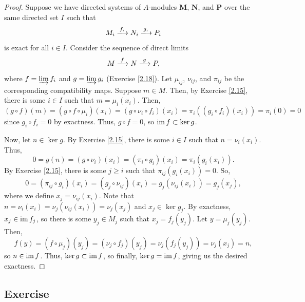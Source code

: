 \begin{proof}
Suppose we have directed systems of $A$-modules $\mathbf{M}$, $\mathbf{N}$, and $\mathbf{P}$ over the same directed set $I$ such that
$$M_i \xlongrightarrow{f_i} N_i \xlongrightarrow{g_i} P_i$$
is exact for all $i \in I$. Consider the sequence of direct limits
$$M \xlongrightarrow{f} N \xlongrightarrow{g} P,$$
where $f = \varinjlim f_i$ and $g = \varinjlim g_i$ (Exercise \ref{2.18}). Let $\mu_{ij}$, $\nu_{ij}$, and $\pi_{ij}$ be the corresponding
compatibility maps. Suppose $m \in M$. Then, by Exercise \ref{2.15}, there is some $i \in I$ such that $m = \mu_i(x_i)$. Then,
$$(g \circ f)(m) = (g \circ f \circ \mu_i)(x_i) = (g \circ \nu_i \circ f_i)(x_i) = \pi_i((g_i \circ f_i)(x_i)) = \pi_i(0) = 0$$
since $g_i \circ f_i = 0$ by exactness. Thus, $g \circ f = 0$, so $\operatorname{im} f \subset \ker g$.

Now, let $n \in \ker g$. By Exercise \ref{2.15}, there is some $i \in I$ such that $n = \nu_i(x_i)$. Thus,
$$0 = g(n) = (g \circ \nu_i)(x_i) = (\pi_i \circ g_i)(x_i) = \pi_i(g_i(x_i)).$$
By Exercise \ref{2.15}, there is some $j \ge i$ such that $\pi_{ij}(g_i(x_i)) = 0$. So,
$$0 = (\pi_{ij} \circ g_i)(x_i) = (g_j \circ \nu_{ij})(x_i) = g_j(\nu_{ij}(x_i)) = g_j(x_j),$$
where we define $x_j = \nu_{ij}(x_i)$. Note that $n = \nu_i(x_i) = \nu_j(\nu_{ij}(x_i)) = \nu_j(x_j)$ and $x_j \in \ker g_j$. By exactness, $x_j \in \operatorname{im} f_j$, so there
is some $y_j \in M_j$ such that $x_j = f_j(y_j)$. Let $y = \mu_j(y_j)$. Then,
$$f(y) = (f \circ \mu_j)(y_j) = (\nu_j \circ f_j)(y_j) = \nu_j(f_j(y_j)) = \nu_j(x_j) = n,$$
so $n \in \operatorname{im} f$. Thus, $\ker g \subset \operatorname{im} f$, so finally, $\ker g = \operatorname{im} f$, giving us the desired exactness.
\end{proof}

\subsection{Exercise}\label{2.20} %

